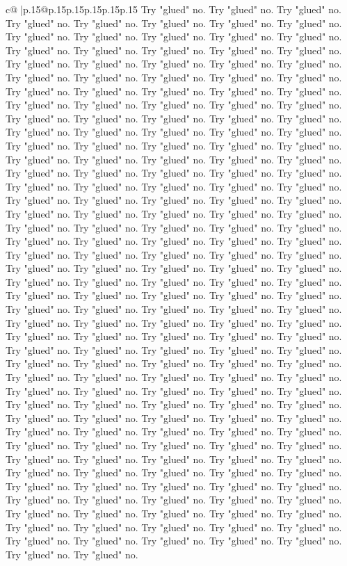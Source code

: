 \documentclass{article}
\begin{document}
{\begin{supertabular}{c@{$\;$}|p{.15\linewidth}@{}p{.15\linewidth}p{.15\linewidth}p{.15\linewidth}p{.15\linewidth}p{.15\linewidth}}
{{{Try "glued" no. Try "glued" no. Try "glued" no. Try "glued" no. Try "glued" no. Try "glued" no. Try "glued" no. Try "glued" no. Try "glued" no. Try "glued" no. Try "glued" no. Try "glued" no. Try "glued" no. Try "glued" no. Try "glued" no. Try "glued" no. Try "glued" no. Try "glued" no. Try "glued" no. Try "glued" no. Try "glued" no. Try "glued" no. Try "glued" no. Try "glued" no. Try "glued" no. Try "glued" no. Try "glued" no. Try "glued" no. Try "glued" no. Try "glued" no. Try "glued" no. Try "glued" no. Try "glued" no. Try "glued" no. Try "glued" no. Try "glued" no. Try "glued" no. Try "glued" no. Try "glued" no. Try "glued" no. Try "glued" no. Try "glued" no. Try "glued" no. Try "glued" no. Try "glued" no. Try "glued" no. Try "glued" no. Try "glued" no. Try "glued" no. Try "glued" no. Try "glued" no. Try "glued" no. Try "glued" no. Try "glued" no. Try "glued" no. Try "glued" no. Try "glued" no. Try "glued" no. Try "glued" no. Try "glued" no. Try "glued" no. Try "glued" no. Try "glued" no. Try "glued" no. Try "glued" no. Try "glued" no. Try "glued" no. Try "glued" no. Try "glued" no. Try "glued" no. Try "glued" no. Try "glued" no. Try "glued" no. Try "glued" no. Try "glued" no. Try "glued" no. Try "glued" no. Try "glued" no. Try "glued" no. Try "glued" no. Try "glued" no. Try "glued" no. Try "glued" no. Try "glued" no. Try "glued" no. Try "glued" no. Try "glued" no. Try "glued" no. Try "glued" no. Try "glued" no. Try "glued" no. Try "glued" no. Try "glued" no. Try "glued" no. Try "glued" no. Try "glued" no. Try "glued" no. Try "glued" no. Try "glued" no. Try "glued" no. Try "glued" no. Try "glued" no. Try "glued" no. Try "glued" no. Try "glued" no. Try "glued" no. Try "glued" no. Try "glued" no. Try "glued" no. Try "glued" no. Try "glued" no. Try "glued" no. Try "glued" no. Try "glued" no. Try "glued" no. Try "glued" no. Try "glued" no. Try "glued" no. Try "glued" no. Try "glued" no. Try "glued" no. Try "glued" no. Try "glued" no. Try "glued" no. Try "glued" no. Try "glued" no. Try "glued" no. Try "glued" no. Try "glued" no. Try "glued" no. Try "glued" no. Try "glued" no. Try "glued" no. Try "glued" no. Try "glued" no. Try "glued" no. Try "glued" no. Try "glued" no. Try "glued" no. Try "glued" no. Try "glued" no. Try "glued" no. Try "glued" no. Try "glued" no. Try "glued" no. Try "glued" no. Try "glued" no. Try "glued" no. Try "glued" no. Try "glued" no. Try "glued" no. Try "glued" no. Try "glued" no. Try "glued" no. Try "glued" no. Try "glued" no. Try "glued" no. Try "glued" no. Try "glued" no. Try "glued" no. Try "glued" no. Try "glued" no. Try "glued" no. Try "glued" no. Try "glued" no. Try "glued" no. Try "glued" no. Try "glued" no. Try "glued" no. Try "glued" no. Try "glued" no. Try "glued" no. Try "glued" no. Try "glued" no. Try "glued" no. Try "glued" no. Try "glued" no. Try "glued" no. Try "glued" no. Try "glued" no. Try "glued" no. Try "glued" no. Try "glued" no. Try "glued" no. Try "glued" no. Try "glued" no. Try "glued" no. Try "glued" no. Try "glued" no. Try "glued" no. Try "glued" no. Try "glued" no. Try "glued" no. Try "glued" no. Try "glued" no. Try "glued" no. Try "glued" no. Try "glued" no. Try "glued" no. Try "glued" no. }}}
\end{supertabular}}
\end{document}
